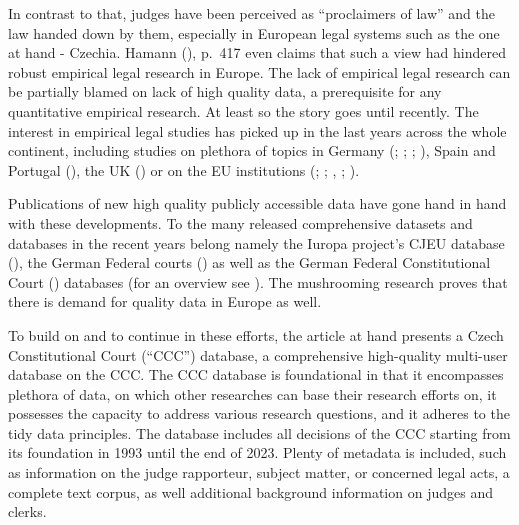 \documentclass[
  11pt,
]{article}
\begin{document}
In contrast to that, judges have been perceived as ``proclaimers of law'' and the law handed down by them, especially in European legal systems such as the one at hand - Czechia. Hamann (), p.~417 even claims that such a view had hindered robust empirical legal research in Europe. The lack of empirical legal research can be partially blamed on lack of high quality data, a prerequisite for any quantitative empirical research. At least so the story goes until recently. The interest in empirical legal studies has picked up in the last years across the whole continent, including studies on plethora of topics in Germany (; ; ; ), Spain and Portugal (), the UK () or on the EU institutions (; ; , ; ).

Publications of new high quality publicly accessible data have gone hand in hand with these developments. To the many released comprehensive datasets and databases in the recent years belong namely the Iuropa project's CJEU database (), the German Federal courts () as well as the German Federal Constitutional Court () databases (for an overview see ). The mushrooming research proves that there is demand for quality data in Europe as well.

To build on and to continue in these efforts, the article at hand presents a Czech Constitutional Court (``CCC'') database, a comprehensive high-quality multi-user database on the CCC. The CCC database is foundational in that it encompasses plethora of data, on which other researches can base their research efforts on, it possesses the capacity to address various research questions, and it adheres to the tidy data principles. The database includes all decisions of the CCC starting from its foundation in 1993 until the end of 2023. Plenty of metadata is included, such as information on the judge rapporteur, subject matter, or concerned legal acts, a complete text corpus, as well additional background information on judges and clerks.
\end{document}
